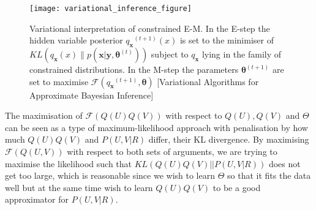 \documentclass{article}
\theoremstyle{plain}
\begin{document}
\begin{figure}[h]
\begin{center}
\centerline{\texttt{[image: variational\_inference\_figure]}}
\end{center}
\caption{Variational interpretation of constrained E-M. In the E-step the hidden variable posterior ${q_\boldsymbol{x}} ^{(t+1)}(x)$ is set to the minimiser of $KL({q_\boldsymbol{x}}(x) \|p(\boldsymbol{x}|\boldsymbol{y},\boldsymbol{\theta}^{(t)}))$ subject to $q_\boldsymbol{x}$ lying in the family of constrained distributions. In the M-step the parameters $\boldsymbol{\theta}^{(t+1)}$ are set to maximise $\mathcal{F}({q_\boldsymbol{x}} ^{(t+1)},\boldsymbol{\theta})$ [Variational Algorithms for Approximate Bayesian Inference] } %
\end{figure}

The maximisation of $\mathcal{F}(Q(U)Q(V))$ with respect to $Q(U),Q(V)$ and $\Theta$ can be seen as a type of maximum-likelihood approach with penalisation by how much $Q(U)Q(V)$ and $P(U,V|R)$ differ, their KL divergence. By maximising $\mathcal{F}(Q(U,V))$ with respect to both sets of arguments, we are trying to maximise the likelihood such that $KL(Q(U)Q(V)||P(U,V|R))$ does not get too large, which is reasonable since we wish to learn $\Theta$ so that it fits the data well but at the same time wish to learn $Q(U)Q(V)$ to be a good approximator for $P(U,V|R)$.
\end{document}
